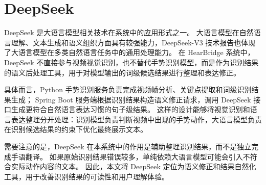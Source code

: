 
\section{DeepSeek}

DeepSeek 是大语言模型相关技术在系统中的应用形式之一。
大语言模型在自然语言理解、文本生成和语义组织方面具有较强能力，DeepSeek-V3 技术报告也体现了大语言模型在多类自然语言任务中的通用处理能力\cite{deepseek-v3-2024}。
在 HearBridge 系统中，DeepSeek 不直接参与视频视觉识别，也不替代手势识别模型，而是作为识别结果的语义后处理工具，用于对模型输出的词级候选结果进行整理和表达修正。

具体而言，Python 手势识别服务负责完成视频帧分析、关键点提取和词级识别结果生成；
Spring Boot 服务端根据识别结果构造语义修正请求，调用 DeepSeek 接口生成更符合自然语言表达习惯的句子级结果。
这样的设计能够将视觉识别和语言表达整理分开处理：识别模型负责判断视频中出现的手势动作，大语言模型负责在识别候选结果的约束下优化最终展示文本。

需要注意的是，DeepSeek 在本系统中的作用是辅助整理识别结果，而不是独立完成手语翻译。
如果原始识别结果错误较多，单纯依赖大语言模型可能会引入不符合实际动作内容的文本。
因此，本文将 DeepSeek 定位为语义修正和结果自然化工具，用于改善识别结果的可读性和用户理解体验。
